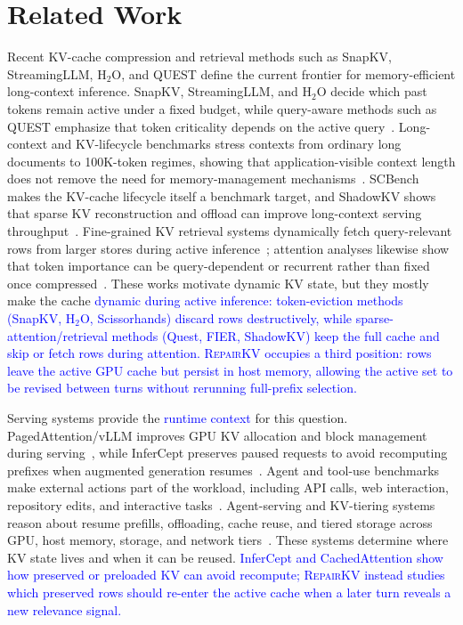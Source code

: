 \documentclass{article}
\newcommand{\repairkv}{\textsc{RepairKV}}
\begin{document}
\section{Related Work}
\label{sec:related}

Recent KV-cache compression and retrieval methods such as SnapKV,
StreamingLLM, H$_2$O, and QUEST define the current frontier for
memory-efficient long-context inference.
SnapKV, StreamingLLM, and H$_2$O decide which past tokens remain active
under a fixed budget, while query-aware methods such as QUEST emphasize
that token criticality depends on the active
query~\citep{snapkv,streamingllm,h2o,quest}.
Long-context and KV-lifecycle benchmarks stress contexts from ordinary
long documents to 100K-token regimes, showing that
application-visible context length does not remove the need for
memory-management mechanisms~\citep{longbench,inftybench,ruler,scbench}.
SCBench makes the KV-cache lifecycle itself a benchmark target, and
ShadowKV shows that sparse KV reconstruction and offload can improve
long-context serving throughput~\citep{scbench,shadowkv}.
Fine-grained KV retrieval systems dynamically fetch query-relevant rows
from larger stores during active inference~\citep{quest,fier,pariskv};
attention analyses likewise show that token importance can be
query-dependent or recurrent rather than fixed once
compressed~\citep{retrieval_heads,lazy_eviction}.
These works motivate dynamic KV state, but they mostly make the cache 
\textcolor{blue}{dynamic during active inference: token-eviction methods
(SnapKV, H$_2$O, Scissorhands) discard rows destructively, while
sparse-attention/retrieval methods (Quest, FIER, ShadowKV) keep the
full cache and skip or fetch rows during attention. \repairkv{} occupies
a third position: rows leave the active GPU cache but persist in host
memory, allowing the active set to be revised between turns without rerunning
full-prefix selection.}

Serving systems provide the \textcolor{blue}{runtime context} for this question.
PagedAttention/vLLM improves GPU KV allocation and block management during
serving~\citep{vllm}, while InferCept preserves paused requests to avoid
recomputing prefixes when augmented generation resumes~\citep{infercept}.
Agent and tool-use benchmarks make external actions part of the workload,
including API calls, web interaction, repository edits, and interactive
tasks~\citep{toollm,webarena,swebench,agentbench}.
Agent-serving and KV-tiering systems reason about resume prefills,
offloading, cache reuse, and tiered storage across GPU, host memory,
storage, and network tiers~\citep{continuum,agentserve,lmcache,ttkv,cachedattention}.
These systems determine where KV state lives and when it can be reused.
\textcolor{blue}{InferCept and CachedAttention show how preserved or preloaded KV can avoid
recompute; \repairkv{} instead studies which preserved rows should re-enter
the active cache when a later turn reveals a new relevance signal.}
\end{document}
